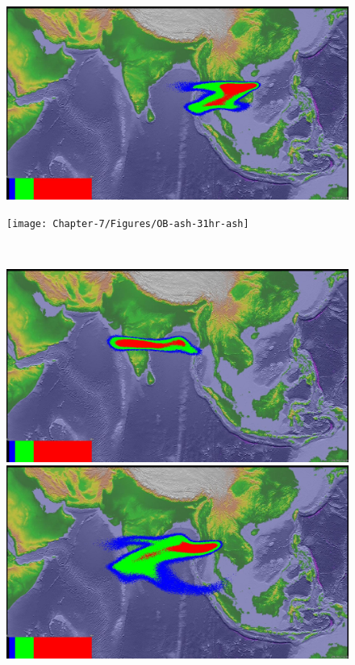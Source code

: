 \begin{figure}[!htb]
\begin{minipage}{.325\textwidth}
    \end{minipage}%
    \begin{minipage}{.325 \textwidth}
        \centering
        \includegraphics[width=0.99 \textwidth]{Chapter-7/Figures/SPH-Plume-31hr-ash}
    \end{minipage}%
    \begin{minipage}{.325 \textwidth}
        \centering
        \texttt{[image: Chapter-7/Figures/OB-ash-31hr-ash]}
    \end{minipage}%
    \\
        \begin{minipage}{.325\textwidth}
        \centering
        \includegraphics[width=0.99 \textwidth]{Chapter-7/Figures/bent-55hr-ash}
    \end{minipage}%
    \begin{minipage}{.325 \textwidth}
        \centering
        \includegraphics[width=0.99 \textwidth]{Chapter-7/Figures/SPH-Plume-55hr-ash}

\end{minipage}
\end{figure}
